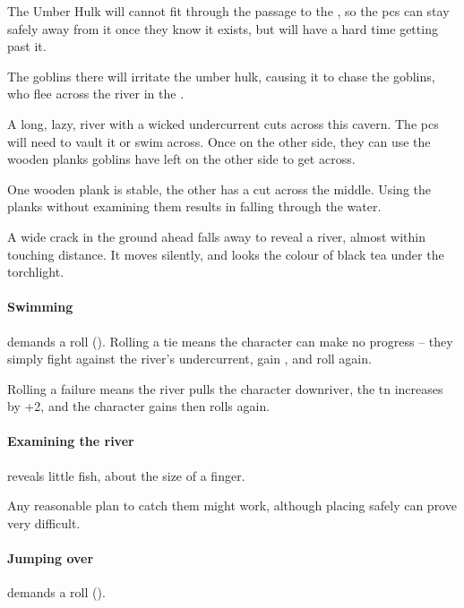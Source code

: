\begin{multicols}{2}
The Umber Hulk will cannot fit through the passage to the , so the \glspl{pc} can stay safely away from it once they know it exists, but will have a hard time getting past it.

\umberhulk

The goblins there will irritate the umber hulk, causing it to chase the goblins, who flee across the river in the .


A long, lazy, river with a wicked undercurrent cuts across this cavern.
The \glspl{pc} will need to vault it or swim across.
Once on the other side, they can use the wooden planks goblins have left on the other side to get across.

One wooden plank is stable, the other has a cut across the middle.
Using the planks without examining them results in  falling through the water.

\begin{boxtext}
  A wide crack in the ground ahead falls away to reveal a river, almost within touching distance.
  It moves silently, and looks the colour of black tea under the torchlight.
\end{boxtext}

\paragraph{Swimming}
demands a  roll (\tn[10]).
Rolling a tie means the character can make no progress -- they simply fight against the river's undercurrent, gain , and roll again.

Rolling a failure means the river pulls the character downriver, the \gls{tn} increases by +2, and the character gains  then rolls again.

\paragraph{Examining the river}
reveals little fish, about the size of a finger.

Any reasonable plan to catch them might work, although placing  safely can prove very difficult.

\paragraph{Jumping over}
demands a  roll (\tn[12]).


\end{multicols}
